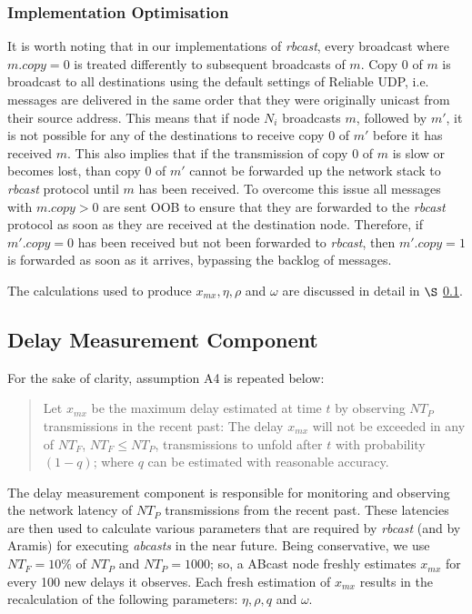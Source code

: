     \subsubsection*{Implementation Optimisation}
    It is worth noting that in our implementations of \emph{rbcast}, every broadcast where $m.copy = 0$ is treated differently to subsequent broadcasts of $m$.  Copy 0 of $m$ is broadcast to all destinations using the default settings of Reliable UDP, i.e. messages are delivered in the same order that they were originally unicast from their source address.  This means that if node $N_i$ broadcasts $m$, followed by $m'$, it is not possible for any of the destinations to receive copy $0$ of $m'$ before it has received $m$.  This also implies that if the transmission of copy $0$ of $m$ is slow or becomes lost, than copy $0$ of $m'$ cannot be forwarded up the network stack to \emph{rbcast} protocol until $m$ has been received.  To overcome this issue all messages with $m.copy > 0$ are sent OOB to ensure that they are forwarded to the \emph{rbcast} protocol as soon as they are received at the destination node.  Therefore, if $m'.copy = 0$ has been received but not been forwarded to \emph{rbcast}, then $m'.copy = 1$ is forwarded as soon as it arrives, bypassing the backlog of messages.  
    
    The calculations used to produce $x_{mx}, \eta, \rho$ and $\omega$ are discussed in detail in $\S$ \ref{ssec:dmc}.  
    
    \subsection{Delay Measurement Component}\label{ssec:dmc}
        For the sake of clarity, assumption A4 is repeated below:   
        
        \begin{quotation}
            Let $x_{mx}$ be the maximum delay estimated at time $t$ by observing $NT_P$ transmissions in the recent past: The delay $x_{mx}$ will not be exceeded in any of $NT_F$, $NT_F \leq NT_P$, transmissions to unfold after $t$ with probability $(1 - q)$; where $q$ can be estimated with reasonable accuracy.  
        \end{quotation}
    
        The delay measurement component is responsible for monitoring and observing the network latency of $NT_P$ transmissions from the recent past.  These latencies are then used to calculate various parameters that are required by \emph{rbcast} (and by \textsf{Aramis}) for executing \emph{abcasts} in the near future.  Being conservative, we use $NT_F = 10\%$ of $NT_P$ and $NT_P=1000$; so, a \textsf{ABcast} node freshly estimates $x_{mx}$ for every 100 new delays it observes.  Each fresh estimation of $x_{mx}$ results in the recalculation of the following parameters: $\eta, \rho, q$ and $\omega$.  
        

